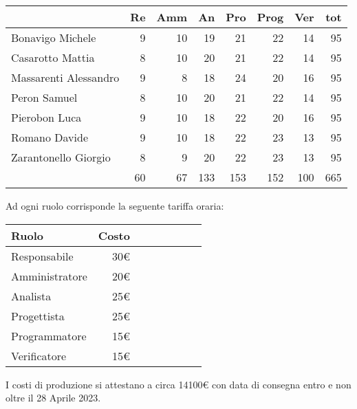 \begin{table}[ht]
    \begin{tabularx}{\linewidth}{X|rrrrrrr}
    \rowcolor{gray!30}& Re & Amm & An & Pro & Prog & Ver & tot \\
    \hline
    Bonavigo Michele                        & 9 & 10 & 19 & 21 & 22 & 14 & 95 \\
    \rowcolor{gray!10}Casarotto Mattia      & 8 & 10 & 20 & 21 & 22 & 14 & 95 \\
    Massarenti Alessandro                   & 9 & 8 & 18 & 24 & 20 & 16 & 95 \\
    \rowcolor{gray!10}Peron Samuel          & 8 & 10 & 20 & 21 & 22 & 14 & 95 \\
    Pierobon Luca                           & 9 & 10 & 18 & 22 & 20 & 16 & 95 \\
    \rowcolor{gray!10}Romano Davide         & 9 & 10 & 18 & 22 & 23 & 13 & 95 \\
    Zarantonello Giorgio                    & 8 & 9 & 20 & 22 & 23 & 13 & 95 \\
    \hline                                  & 60 & 67 & 133 & 153 & 152 & 100 & 665 \\ 
    \end{tabularx}
\end{table}

Ad ogni ruolo corrisponde la seguente tariffa oraria:

\begin{table}[ht]
    \begin{tabularx}{\linewidth}{X|rrrrrrr}
    \rowcolor{gray!30}Ruolo & Costo \\
    \hline
    Responsabile                       & 30€ \\
    \rowcolor{gray!10}Amministratore   & 20€ \\
    Analista                           & 25€ \\
    \rowcolor{gray!10}Progettista       & 25€ \\
    Programmatore                       & 15€ \\
    \rowcolor{gray!10}Verificatore      & 15€ \\
    \hline
    \end{tabularx}
\end{table}

I costi di produzione si attestano a circa 14100€ con data di consegna entro e non oltre il 28 Aprile 2023.












